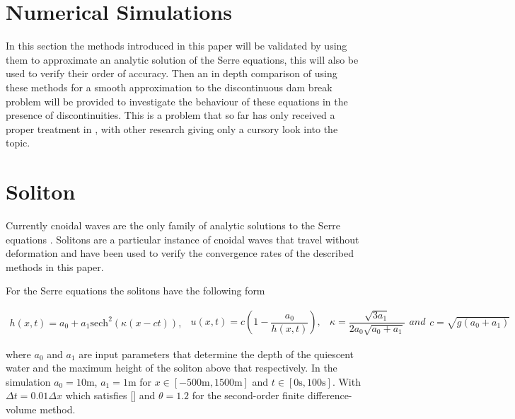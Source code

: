\documentclass[SingleSpace,12pt,Proceedings]{Serre_ASCE}
\begin{document}
\section{Numerical Simulations}
\label{section:Numerical Simulations}
In this section the methods introduced in this paper will be validated by using them to approximate an analytic solution of the Serre equations, this will also be used to verify their order of accuracy. Then an in depth comparison of using these methods for a smooth approximation to the discontinuous dam break problem will be provided to investigate the behaviour of these equations in the presence of discontinuities. This is a problem that so far has only received a proper treatment in \cite{El-etal-2006}, with other research giving only a cursory look into the topic. 

\section{Soliton}
\label{section:Convergence Rate}
Currently cnoidal waves are the only family of analytic solutions to the Serre equations \cite{Carter-Cienfuegos-2010-259}. Solitons are a particular instance of cnoidal waves that travel without deformation and have been used to verify the convergence rates of the described methods in this paper. 

For the Serre equations the solitons have the following form
\begin{linenomath*}
\begin{subequations}
\begin{gather}
h\left(x,t\right) = a_0 + a_1\text{sech}^2\left( \kappa\left(x - ct\right)\right),
\end{gather}
\begin{gather}
u\left(x,t\right) = c\left(1 - \dfrac{a_0}{h(x,t)} \right),
\end{gather}
\begin{gather}
\kappa = \dfrac{\sqrt{3a_1}}{2a_0 \sqrt{ a_0 + a_1}}
\end{gather}
and
\begin{gather}
c = \sqrt{g \left(a_0 + a_1\right)}
\end{gather}
\end{subequations}
\label{eq:sol}
\end{linenomath*}
where $a_0$ and $a_1$ are input parameters that determine the depth of the quiescent water and the maximum height of the soliton above that respectively. In the simulation $a_0 = 10\text{m}$, $a_1 = 1\text{m}$ for $x\in\left[-500\text{m},1500\text{m}\right]$ and $t\in\left[0\text{s},100\text{s}\right]$. With $\Delta t = 0.01 \Delta x$ which satisfies [] and $\theta = 1.2$ for the second-order finite difference-volume method.
\end{document}
